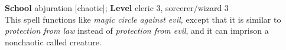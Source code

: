 \textbf{School} abjuration [chaotic]; \textbf{Level} cleric 3, sorcerer/wizard 3\\
This spell functions like \textit{magic circle against evil, }except that it is similar to \textit{protection from law }instead of \textit{protection from evil}, and it can imprison a nonchaotic called creature.\\
